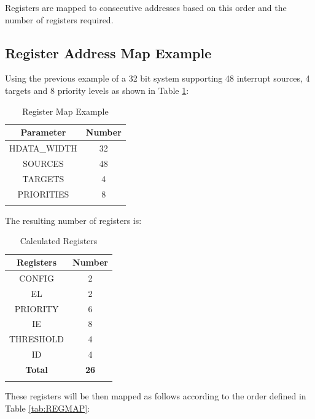 Registers are mapped to consecutive addresses based on this order and the
number of registers required.  

\subsection{Register Address Map Example}

Using the previous example of a 32 bit system supporting 48 interrupt sources, 4 targets and 8 priority levels as shown in Table \ref{tab:REGMAPEX}:

\begin{longtable}[c]{@{}cc@{}}	
		\toprule 
		\textbf{Parameter} & \textbf{Number}\\
		\midrule 
		\endhead
		HDATA\_WIDTH & 32\\
		SOURCES & 48\\
		TARGETS & 4\\
		PRIORITIES & 8\\
		\bottomrule 	
 
	\caption{Register Map Example}
	\label{tab:REGMAPEX}
\end{longtable}

The resulting number of registers is:

\begin{longtable}[c]{@{}cc@{}}	
		\toprule 
		\textbf{Registers} & \textbf{Number}\\
		\midrule 
		\endhead
		CONFIG & 2\\
		EL & 2\\
		PRIORITY & 6\\
		IE & 8\\
		THRESHOLD & 4\\
		ID & 4\\
		\midrule
		\textbf{Total} & \textbf{26}\\
		\bottomrule 	
	\caption{Calculated Registers}
	\label{tab:REGMAPNUM}
\end{longtable}


These registers will be then mapped as follows according to the order
defined in Table \ref{tab:REGMAP}:

